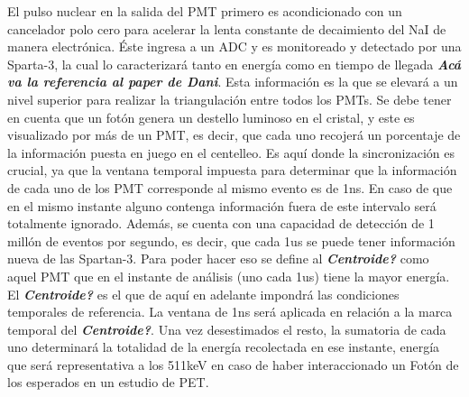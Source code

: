 \documentclass[conference]{IEEEtran}
\begin{document}
El pulso nuclear en la salida del PMT primero es acondicionado con un cancelador polo cero para acelerar la lenta constante de decaimiento del NaI de manera electrónica. Éste ingresa a un ADC y es monitoreado y detectado por una Sparta-3, la cual lo caracterizará tanto en energía como en tiempo de llegada \textit{\textbf{Acá va la referencia al paper de Dani}}. Esta información es la que se elevará a un nivel superior para realizar la triangulación entre todos los PMTs.
Se debe tener en cuenta que un fotón genera un destello luminoso en el cristal, y este es visualizado por más de un PMT, es decir, que cada uno recojerá un porcentaje de la información puesta en juego en el centelleo.
Es aquí donde la sincronización es crucial, ya que la ventana temporal impuesta para determinar que la información de cada uno de los PMT corresponde al mismo evento es de 1ns. En caso de que en el mismo instante alguno contenga información fuera de este intervalo será totalmente ignorado.
Además, se cuenta con una capacidad de detección de 1 millón de eventos por segundo, es decir, que cada 1us se puede tener información nueva de las Spartan-3.
Para poder hacer eso se define al \textit{\textbf{Centroide?}} como aquel PMT que en el instante de análisis (uno cada 1us) tiene la mayor energía. El \textit{\textbf{Centroide?}} es el que de aquí en adelante impondrá las condiciones temporales de referencia. La ventana de 1ns será aplicada en relación a la marca temporal del \textit{\textbf{Centroide?}}.
Una vez desestimados el resto, la sumatoria de cada uno determinará la totalidad de la energía recolectada en ese instante, energía que será representativa a los 511keV en caso de haber interaccionado un Fotón de los esperados en un estudio de PET.

\end{document}
